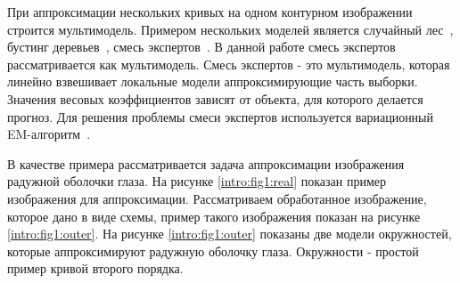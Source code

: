 При аппроксимации нескольких кривых на одном контурном изображении строится мультимодель. Примером нескольких моделей является случайный лес~\cite{Ishwaran2012}, бустинг деревьев~\cite{Chunyan2016}, смесь экспертов~\cite{Yuksel2012}. В данной работе смесь экспертов рассматривается как мультимодель. Смесь экспертов - это мультимодель, которая линейно взвешивает локальные модели аппроксимирующие часть выборки. Значения весовых коэффициентов зависят от объекта, для которого делается прогноз. Для решения проблемы смеси  экспертов используется вариационный EM-алгоритм~\cite{Dempster1977,bishop2006,Peng1996}.

В качестве примера рассматривается задача аппроксимации изображения радужной оболочки глаза. На рисунке \ref{intro:fig1:real} показан пример изображения для аппроксимации. Рассматриваем обработанное изображение, которое дано в виде схемы, пример такого изображения показан на рисунке \ref{intro:fig1:outer}. На рисунке \ref{intro:fig1:outer} показаны две модели окружностей, которые аппроксимируют радужную оболочку глаза. Окружности - простой пример кривой второго порядка.

